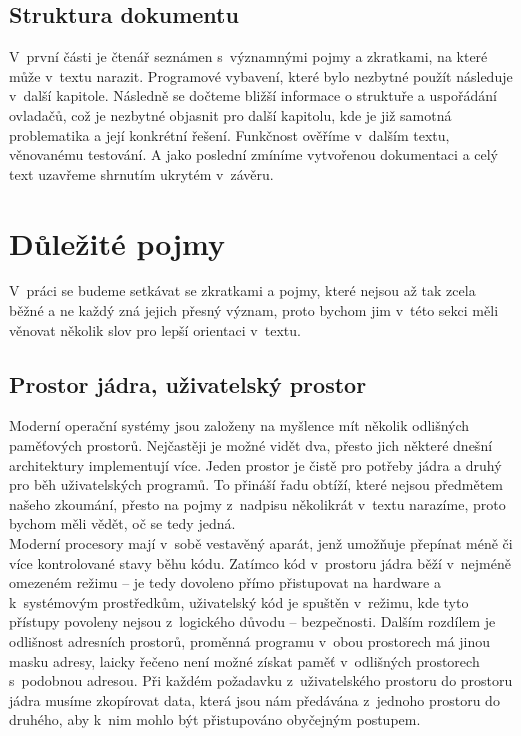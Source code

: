 \documentclass[final,11pt]{fithesis}
\begin{document}
  \section{Struktura dokumentu}
  V~první části je čtenář seznámen s~významnými pojmy a zkratkami, na které
  může v~textu narazit. Programové vybavení, které bylo nezbytné použít
  následuje v~další kapitole. Následně se dočteme bližší informace o struktuře
  a uspořádání ovladačů, což je nezbytné objasnit pro další kapitolu, kde je
  již samotná problematika a její konkrétní řešení. Funkčnost ověříme
  v~dalším textu, věnovanému testování. A jako poslední zmíníme
  vytvořenou dokumentaci a celý text uzavřeme shrnutím ukrytém v~závěru.

\chapter{Důležité pojmy}
  V~práci se budeme setkávat se zkratkami a pojmy, které nejsou až tak zcela
  běžné a ne každý zná jejich přesný význam, proto bychom jim v~této sekci měli
  věnovat několik slov pro lepší orientaci v~textu.
  \section{Prostor jádra, uživatelský prostor}
  Moderní operační systémy jsou založeny na myšlence mít několik odlišných
  paměťových prostorů. Nejčastěji je možné vidět dva, přesto
  jich některé dnešní architektury implementují více. Jeden prostor je
  čistě pro potřeby jádra a druhý pro běh uživatelských programů. To přináší
  řadu obtíží, které nejsou předmětem našeho zkoumání, přesto na pojmy
  z~nadpisu několikrát v~textu narazíme, proto bychom měli vědět, oč se tedy
  jedná. \\ \indent
  Moderní procesory mají v~sobě vestavěný aparát, jenž umožňuje přepínat méně
  či více kontrolované stavy běhu kódu. Zatímco kód v~prostoru jádra běží
  v~nejméně omezeném režimu -- je tedy dovoleno přímo přistupovat na hardware a
  k~systémovým prostředkům, uživatelský kód je spuštěn v~režimu, kde tyto
  přístupy povoleny nejsou z~logického důvodu -- bezpečnosti. Dalším rozdílem
  je odlišnost adresních prostorů, proměnná programu v~obou prostorech má
  jinou masku adresy, laicky řečeno není možné získat paměť v~odlišných
  prostorech s~podobnou adresou. Při každém požadavku z~uživatelského prostoru
  do prostoru jádra musíme zkopírovat data, která jsou nám předávána z~jednoho
  prostoru do druhého, aby k~nim mohlo být přistupováno obyčejným postupem.
\end{document}
